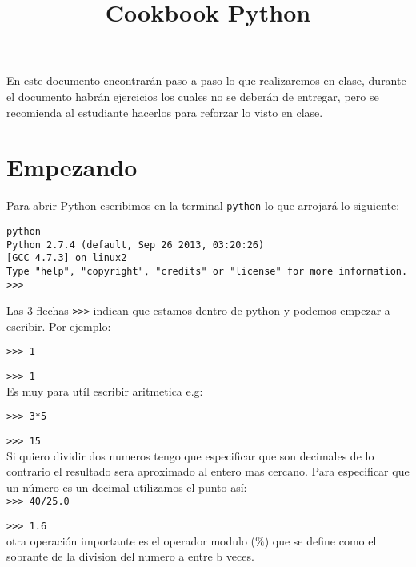 \documentclass[12pt]{article}
\title{\begin{LARGE}
{Cookbook Python}
\end{LARGE}}
\begin{document}
\maketitle




En este documento encontrar\'an paso a paso lo que realizaremos en clase, 
durante el documento habr\'an ejercicios los cuales no se deber\'an de 
entregar, pero se recomienda al estudiante hacerlos para reforzar lo visto 
en clase. 

\section{Empezando}

Para abrir Python escribimos en la terminal \verb"python" lo que arrojar\'a lo siguiente:

\begin{verbatim}
python
Python 2.7.4 (default, Sep 26 2013, 03:20:26) 
[GCC 4.7.3] on linux2
Type "help", "copyright", "credits" or "license" for more information.
>>> 
\end{verbatim}

 Las 3 flechas \verb">>>" indican que estamos dentro de python y podemos empezar a escribir. Por ejemplo:

\verb">>> 1"

\verb">>> 1"\\

Es muy para ut\'il escribir aritmetica e.g:

\verb">>> 3*5" 

\verb">>> 15" \\

Si quiero dividir dos numeros tengo que especificar que son decimales de lo contrario el resultado sera aproximado al 
entero mas cercano. Para especificar que un n\'umero es un decimal utilizamos el punto as\'i:\\

\verb">>> 40/25.0"

\verb">>> 1.6" \\

otra operaci\'on importante es el operador modulo ($\%$) que se define como el sobrante de la division del numero a entre b veces.
\end{document}
